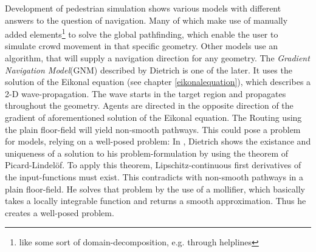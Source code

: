 Development of pedestrian simulation shows various models with different answers to the question of navigation. Many of which make use of manually added elements\footnote{like some sort of domain-decomposition, e.g. through helplines} to solve the global pathfinding, which enable the user to simulate crowd movement in that specific geometry. Other models use an algorithm, that will supply a navigation direction for any geometry. The \emph{Gradient Navigation Model}(GNM) described by Dietrich\citep{Dietrich2014} is one of the later. It uses the solution of the Eikonal equation (see chapter \ref{eikonalequation}), which describes a 2-D wave-propagation. The wave starts in the target region and propagates throughout the geometry. Agents are directed in the opposite direction of the gradient of aforementioned solution of the Eikonal equation. The Routing using the plain floor-field will yield non-smooth pathways. This could pose a problem for models, relying on a well-posed problem: In \cite{Dietrich2014}, Dietrich shows the existance and uniqueness of a solution to his problem-formulation by using the theorem of Picard-Lindel{\"o}f.
To apply this theorem, Lipschitz-continuous first derivatives of the input-functions must exist. This contradicts with non-smooth pathways in a plain floor-field. He solves that problem by the use of a mollifier, which basically takes a locally integrable function and returns a smooth approximation. Thus he creates a well-posed problem.

